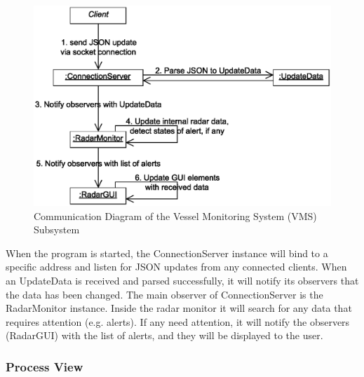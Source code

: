 \documentclass{article}
\begin{document}
\break
\begin{figure}[!htb]
\caption{Communication Diagram of the Vessel Monitoring System (VMS) Subsystem}
\centering
\includegraphics[scale=0.45]{diagrams/vms-communication-diagram.eps}
\end{figure}
When the program is started, the ConnectionServer instance will bind to a specific address and listen for JSON updates from any connected clients. When an UpdateData is received and parsed successfully, it will notify its observers that the data has been changed. The main observer of ConnectionServer is the RadarMonitor instance. Inside the radar monitor it will search for any data that requires attention (e.g. alerts). If any need attention, it will notify the observers (RadarGUI) with the list of alerts, and they will be displayed to the user.

\subsubsection{Process View} %
\end{document}
